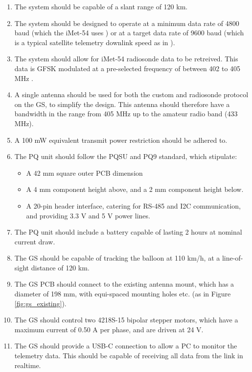\begin{enumerate}
    \item The system should be capable of a slant range of 120 km.
    \item The system should be designed to operate at a minimum data rate of 4800 baud (which the iMet-54 uses \cite{datasheet-iMet54}) or at a target data rate of 9600 baud (which is a typical satellite telemetry downlink speed as in \cite{paper-deployableAntenna}).
    \item The system should allow for iMet-54 radiosonde data to be retreived. This data is GFSK modulated at a pre-selected frequency of between 402 to 405 MHz \cite{datasheet-iMet54}.
    \item A single antenna should be used for both the custom and radiosonde protocol on the GS, to simplify the design. This antenna should therefore have a bandwidth in the range from 405 MHz up to the amateur radio band (433 MHz).
    \item A 100 mW equivalent transmit power restriction should be adhered to.
    \item The PQ unit should follow the PQSU and PQ9 standard, which stipulate:
    \begin{itemize}
        \item A 42 mm square outer PCB dimension
        \item A 4 mm component height above, and a 2 mm component height below.
        \item A 20-pin header interface, catering for RS-485 and I2C communication, and providing 3.3 V and 5 V power lines.
    \end{itemize}
    \item The PQ unit should include a battery capable of lasting 2 hours at nominal current draw.
    \item The GS should be capable of tracking the balloon at 110 km/h, at a line-of-sight distance of 120 km.
    \item The GS PCB should connect to the existing antenna mount, which has a diameter of 198 mm, with equi-spaced mounting holes etc. (as in Figure \ref{fig:gs_existing}).
    \item The GS should control two 4218S-15 bipolar stepper motors, which have a maximum current of 0.50 A per phase, and are driven at 24 V.
    \item The GS should provide a USB-C connection to allow a PC to monitor the telemetry data. This should be capable of receiving all data from the link in realtime.
\end{enumerate}